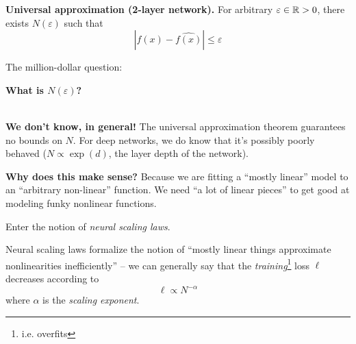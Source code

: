 \begin{frame}
    \begin{theorem}
        \textbf{Universal approximation (2-layer network).} For arbitrary $\varepsilon \in \mathbb{R} > 0$, there
        exists $N(\varepsilon)$ such that 
        \[
        |f(x) - \hat{f(x)}| \leq \varepsilon
        \]
    \end{theorem}
    The million-dollar question:
    \begin{center}
        \textbf{What is $N(\varepsilon)$?}
    \end{center}
\end{frame}
\begin{frame}
    \\
    \textbf{We don't know, in general!} The universal approximation theorem guarantees no bounds on $N$. 
    For deep networks,
    we do know that it's possibly poorly behaved ($N \propto \exp(d)$, the layer depth of the network).
\end{frame}

\begin{frame}
    \textbf{Why does this make sense?} Because we are fitting a ``mostly linear'' model to an ``arbitrary
    non-linear'' function. We need ``a lot of linear pieces'' to get good at modeling funky nonlinear functions.


    Enter the notion of \textit{neural scaling laws}.
\end{frame}

\begin{frame}
    Neural scaling laws formalize the notion of ``mostly linear things approximate nonlinearities inefficiently'' --
    we can generally say that the \textit{training}\footnote{
        i.e. overfits
    } loss $\ell$ decreases according to 
    \[
        \ell \propto N^{-\alpha}
    \]
    where $\alpha$ is the \textit{scaling exponent}. 
\end{frame}


